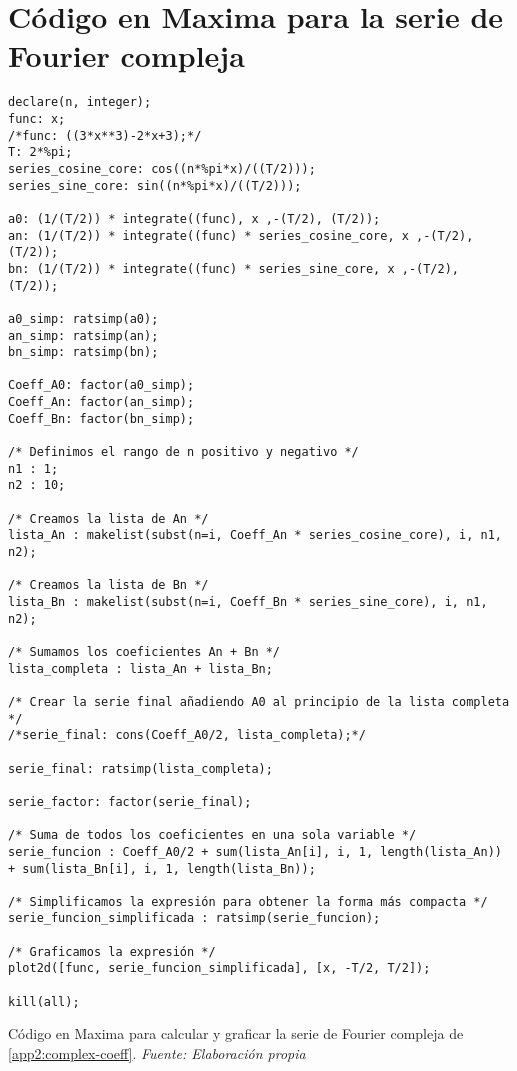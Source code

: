 \section{Código en Maxima para la serie de Fourier compleja}\label{app3:complex-code-maxima}
\begin{longlisting}
	\begin{verbatim}
declare(n, integer);
func: x;
/*func: ((3*x**3)-2*x+3);*/
T: 2*%pi;
series_cosine_core: cos((n*%pi*x)/((T/2)));
series_sine_core: sin((n*%pi*x)/((T/2)));

a0: (1/(T/2)) * integrate((func), x ,-(T/2), (T/2));
an: (1/(T/2)) * integrate((func) * series_cosine_core, x ,-(T/2), (T/2));
bn: (1/(T/2)) * integrate((func) * series_sine_core, x ,-(T/2), (T/2));

a0_simp: ratsimp(a0);
an_simp: ratsimp(an);
bn_simp: ratsimp(bn);

Coeff_A0: factor(a0_simp);
Coeff_An: factor(an_simp);
Coeff_Bn: factor(bn_simp);

/* Definimos el rango de n positivo y negativo */
n1 : 1;
n2 : 10;

/* Creamos la lista de An */
lista_An : makelist(subst(n=i, Coeff_An * series_cosine_core), i, n1, n2);

/* Creamos la lista de Bn */
lista_Bn : makelist(subst(n=i, Coeff_Bn * series_sine_core), i, n1, n2);

/* Sumamos los coeficientes An + Bn */
lista_completa : lista_An + lista_Bn;

/* Crear la serie final añadiendo A0 al principio de la lista completa */
/*serie_final: cons(Coeff_A0/2, lista_completa);*/

serie_final: ratsimp(lista_completa);

serie_factor: factor(serie_final);

/* Suma de todos los coeficientes en una sola variable */
serie_funcion : Coeff_A0/2 + sum(lista_An[i], i, 1, length(lista_An)) + sum(lista_Bn[i], i, 1, length(lista_Bn));

/* Simplificamos la expresión para obtener la forma más compacta */
serie_funcion_simplificada : ratsimp(serie_funcion);

/* Graficamos la expresión */
plot2d([func, serie_funcion_simplificada], [x, -T/2, T/2]);

kill(all);	
	\end{verbatim}
	\caption[Código en Maxima para calcular y graficar la serie de Fourier compleja de \ref{app2:complex-coeff}.] {Código en Maxima para calcular y graficar la serie de Fourier compleja de \ref{app2:complex-coeff}. \textit{Fuente: Elaboración propia}} 
\end{longlisting}



